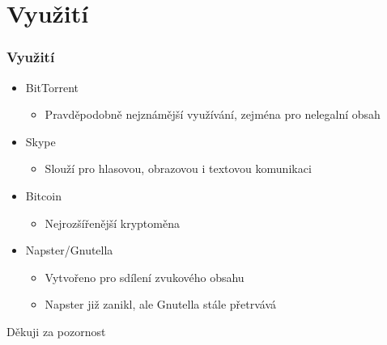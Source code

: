 \documentclass{beamer}
\begin{document}
\section{Využití}
\begin{frame}
\frametitle{Využití}
\begin{itemize}
\item BitTorrent
\begin{itemize}
\item Pravděpodobně nejznámější využívání, zejména pro nelegalní obsah
\end{itemize}
\item Skype
\begin{itemize}
\item Slouží pro hlasovou, obrazovou i textovou komunikaci
\end{itemize}
\item Bitcoin
\begin{itemize}
\item Nejrozšířenější kryptoměna
\end{itemize}
\item Napster/Gnutella
\begin{itemize}
\item Vytvořeno pro sdílení zvukového obsahu
\item Napster již zanikl, ale Gnutella stále přetrvává
\end{itemize}

\end{itemize}
\end{frame}

\begin{frame}
\Huge{\centerline{Děkuji za pozornost}}
\end{frame}
\end{document}
